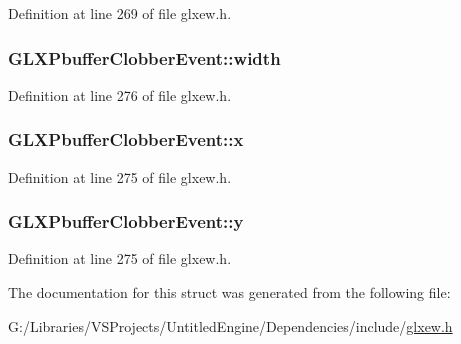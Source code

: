 Definition at line 269 of file glxew.\+h.

\hypertarget{struct_g_l_x_pbuffer_clobber_event_aaca375fecb872c73c60cd5d0bfc7c7a5}{}
\subsubsection[{width}]{ G\+L\+X\+Pbuffer\+Clobber\+Event\+::width}\label{struct_g_l_x_pbuffer_clobber_event_aaca375fecb872c73c60cd5d0bfc7c7a5}


Definition at line 276 of file glxew.\+h.

\hypertarget{struct_g_l_x_pbuffer_clobber_event_a8f0a7162a033c89ee94ce535580dbc32}{}
\subsubsection[{x}]{ G\+L\+X\+Pbuffer\+Clobber\+Event\+::x}\label{struct_g_l_x_pbuffer_clobber_event_a8f0a7162a033c89ee94ce535580dbc32}


Definition at line 275 of file glxew.\+h.

\hypertarget{struct_g_l_x_pbuffer_clobber_event_a69eb7ac60d36ac3ec4550ac206cfc61f}{}
\subsubsection[{y}]{ G\+L\+X\+Pbuffer\+Clobber\+Event\+::y}\label{struct_g_l_x_pbuffer_clobber_event_a69eb7ac60d36ac3ec4550ac206cfc61f}


Definition at line 275 of file glxew.\+h.



The documentation for this struct was generated from the following file\+:\begin{DoxyCompactItemize}
\item 
G\+:/\+Libraries/\+V\+S\+Projects/\+Untitled\+Engine/\+Dependencies/include/\hyperlink{glxew_8h}{glxew.\+h}\end{DoxyCompactItemize}
